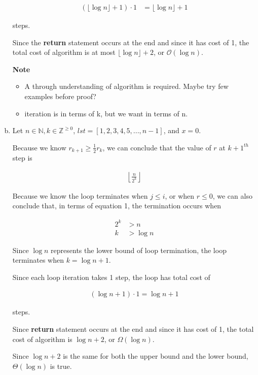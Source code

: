 \documentclass[12pt]{article}
\begin{document}
\begin{enumerate}[a.]
    \begin{align}
        (\lfloor \log n \rfloor + 1) \cdot 1 &= \lfloor \log n \rfloor + 1
    \end{align}

    steps.

    \bigskip

    Since the \textbf{return} statement occurs at the end and since it has cost of 1,
    the total cost of algorithm is at most $\lfloor \log n \rfloor + 2$, or $\mathcal{O}(\log n)$.

    \textbf{Note}

    \begin{itemize}
        \item A through understanding of algorithm is required. Maybe try few examples before proof?
        \item iteration is in terms of k, but we want in terms of n.
    \end{itemize}


    \item

    Let $n \in \mathbb{N}, k \in \mathbb{Z}^{\geq 0}$, $lst=[1,2,3,4,5,...,n-1]$,
    and $x = 0$.

    \bigskip

    Because we know $r_{k+1} \geq \frac{1}{2}r_k$, we can conclude that the value
    of $r$ at $k+1^{th}$ step is

    \setcounter{equation}{0}
    \begin{align}
        \left\lfloor \frac{n}{2^k} \right\rfloor
    \end{align}

    \bigskip

    Because we know the loop terminates when $j \leq i$, or when $r \leq 0$, we
    can also conclude that, in terms of equation 1, the termination occurs when

    \begin{align}
        2^k &> n\\
        k &> \log n
    \end{align}

    \bigskip

    Since $\log n$ represents the lower bound of loop termination, the loop
    terminates when $k = \log n + 1$.

    \bigskip

    Since each loop iteration takes 1 step, the loop has total cost of

    \begin{align}
        (\log n + 1) \cdot 1 = \log n + 1
    \end{align}

    steps.

    \bigskip

    Since \textbf{return} statement occurs at the end and since it has cost of 1,
    the total cost of algorithm is $\log n + 2$, or $\Omega(\log n)$.

    \bigskip

    Since $\log n + 2$ is the same for both the upper bound and the lower bound,
    $\Theta(\log n)$ is true.


\end{enumerate}
\end{document}
